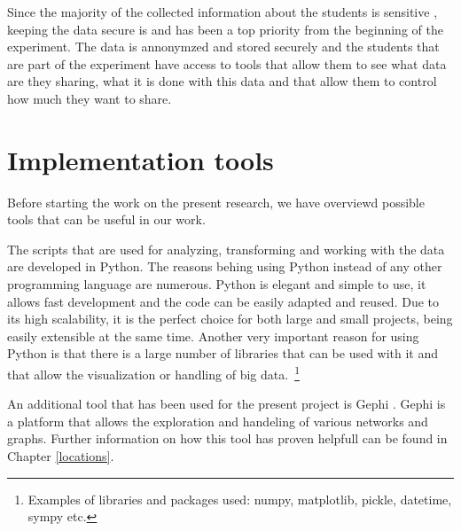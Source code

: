 Since the majority of the collected information about the students is sensitive
\cite{Stopczynski14p}, keeping the data secure is and has been a top priority
from the beginning of the experiment. The data is annonymzed and stored securely
and the students that are part of the experiment have access to tools that allow
them to see what data are they sharing, what it is done with this data and that
allow them to control how much they want to share.

\section{Implementation tools}
Before starting the work on the present research, we have overviewd possible
tools that can be useful in our work.

The scripts that are used for analyzing, transforming and working with the data
are developed in Python. The reasons behing using Python instead of any other
programming language are numerous. Python is elegant and simple to use, it
allows fast development and the code can be easily adapted and reused. Due to
its high scalability, it is the perfect choice for both large and small
projects, being easily extensible at the same time. Another very important
reason for using Python is that there is a large number of libraries that can be
used with it and that allow the visualization or handling of big
data.~\footnote{Examples of libraries and packages used: numpy, matplotlib,
pickle, datetime, sympy etc.}

An additional tool that has been used for the present project is Gephi
\cite{Gephi}. Gephi is a platform that allows the exploration and handeling of
various networks and graphs. Further information on how this tool has proven
helpfull can be found in Chapter \ref{locations}.